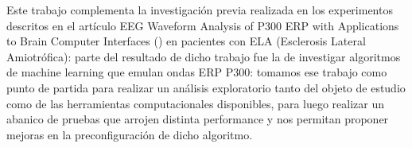 \documentclass[../00_Main.tex]{subfiles}
\begin{document}
Este trabajo complementa la investigación previa realizada en los experimentos descritos en el artículo EEG Waveform Analysis of P300 ERP with Applications to Brain Computer Interfaces (\cite{EEGAnalysisBCI}) en pacientes con ELA (Esclerosis Lateral Amiotrófica): parte del resultado de dicho trabajo fue la de investigar algoritmos de machine learning que emulan ondas ERP P300: tomamos ese trabajo como punto de partida para realizar un análisis exploratorio tanto del objeto de estudio como de las herramientas computacionales disponibles, para luego realizar un abanico de pruebas que arrojen distinta performance y nos permitan proponer mejoras en la preconfiguración de dicho algoritmo.


\biblio %
\end{document}

